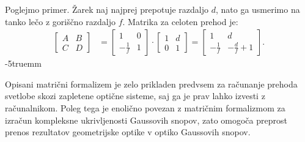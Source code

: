 Poglejmo primer. Žarek naj najprej prepotuje razdaljo $d$, nato ga usmerimo
na tanko lečo z goriščno razdaljo $f$. Matrika za celoten prehod je:
\begin{align}
\left[\begin{array}{cc}
A & B\\
C & D
\end{array}\right] & =  \left[\begin{array}{cc}
1 & 0\\
-\frac{1}{f} & 1
\end{array}\right]\cdot\left[\begin{array}{cc}
1 & d\\
0 & 1
\end{array}\right] =  \left[\begin{array}{cc}
1 & d\\
-\frac{1}{f} & -\frac{d}{f}+1
\end{array}\right]\!\!.
\label{eq:Mdf}
\end{align}
\vglue-5truemm
\begin{remark}
Opisani matrični formalizem je zelo prikladen predvsem za računanje prehoda
svetlobe skozi zapletene optične sisteme, saj ga je prav lahko izvesti z računalnikom. Poleg
tega je enolično povezan z matričnim formalizmom za izračun
kompleksne ukrivljenosti Gaussovih snopov, zato omogoča preprost prenos 
rezultatov geometrijske optike v optiko Gaussovih snopov.
\end{remark}

